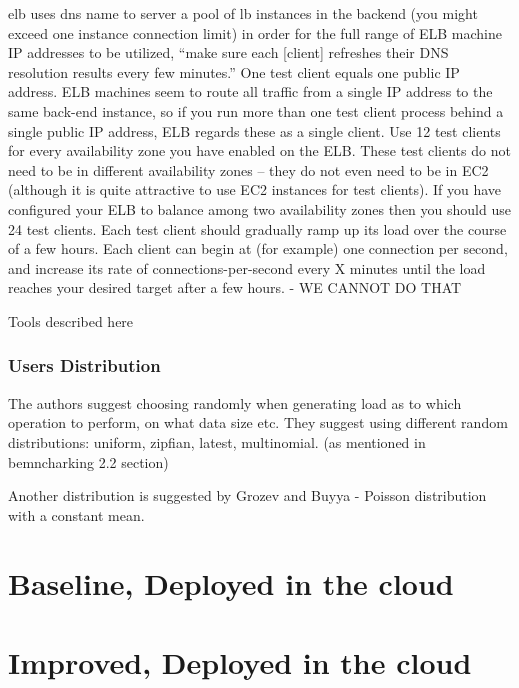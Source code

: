\documentclass{uvamscse}
\begin{document}
elb uses dns name to server a pool of lb instances in the backend (you might exceed one instance connection limit)
in order for the full range of ELB machine IP addresses to be utilized, “make sure each [client] refreshes their DNS resolution results every few minutes.”
One test client equals one public IP address. ELB machines seem to route all traffic from a single IP address to the same back-end instance, so if you run more than one test client process behind a single public IP address, ELB regards these as a single client.
Use 12 test clients for every availability zone you have enabled on the ELB. These test clients do not need to be in different availability zones – they do not even need to be in EC2 (although it is quite attractive to use EC2 instances for test clients). If you have configured your ELB to balance among two availability zones then you should use 24 test clients.
Each test client should gradually ramp up its load over the course of a few hours. Each client can begin at (for example) one connection per second, and increase its rate of connections-per-second every X minutes until the load reaches your desired target after a few hours. - WE CANNOT DO THAT

Tools described here \cite{Load Testing Framework}

\subsubsection{Users Distribution}
The authors suggest choosing randomly when generating load as to which operation to perform, on what data size etc. They suggest using different random distributions: uniform, zipfian, latest, multinomial\cite{Ycsb}. (as mentioned in bemncharking 2.2 section)

Another distribution is suggested by Grozev and Buyya \cite{GroBuy} - Poisson distribution with a constant mean.

\section{Baseline, Deployed in the cloud}

\section{Improved, Deployed in the cloud}

\end{document}
